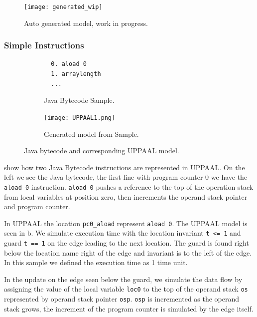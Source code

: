\begin{figure}[H]
\texttt{[image: generated\_wip]}
\caption{Auto generated model, work in progress.}
\label{fig:generated_wip}
\end{figure}

\subsubsection{Simple Instructions}
\begin{figure}[H]
\centering
\begin{subfigure}{.3\textwidth}
  \begin{lstlisting}
  0. aload 0
  1. arraylength
  ...
  \end{lstlisting}
  \caption{Java Bytecode Sample.}
\end{subfigure} 
\hspace{10px}
\begin{subfigure}{.6\textwidth}
  \texttt{[image: UPPAAL1.png]}
  \caption{Generated model from Sample.}
\end{subfigure}
\caption{Java bytecode and corresponding UPPAAL model.}
\label{fig:uppaal1}
\end{figure}
 show how two Java Bytecode instructions are represented in UPPAAL. On the left we see the Java bytecode, the first line with program counter 0 we have the \texttt{aload 0} instruction. \texttt{aload 0} pushes a reference to the top of the operation stack from local variables at position zero, then increments the operand stack pointer and program counter.

In UPPAAL the location \texttt{pc0\_aload} represent \texttt{aload 0}. The UPPAAL model is seen in b. We simulate execution time with the location invariant \texttt{t <= 1}  and guard \texttt{t == 1} on the edge leading to the next location. The guard is found right below the location name right of the edge and invariant is to the left of the edge. In this sample we defined the execution time as 1 time unit.

In the update on the edge seen below the guard, we simulate the data flow by assigning the value of the local variable \texttt{loc0} to the top of the operand stack \texttt{os} represented by operand stack pointer \texttt{osp}. \texttt{osp} is incremented as the operand stack grows, the increment of the program counter is simulated by the edge itself.

